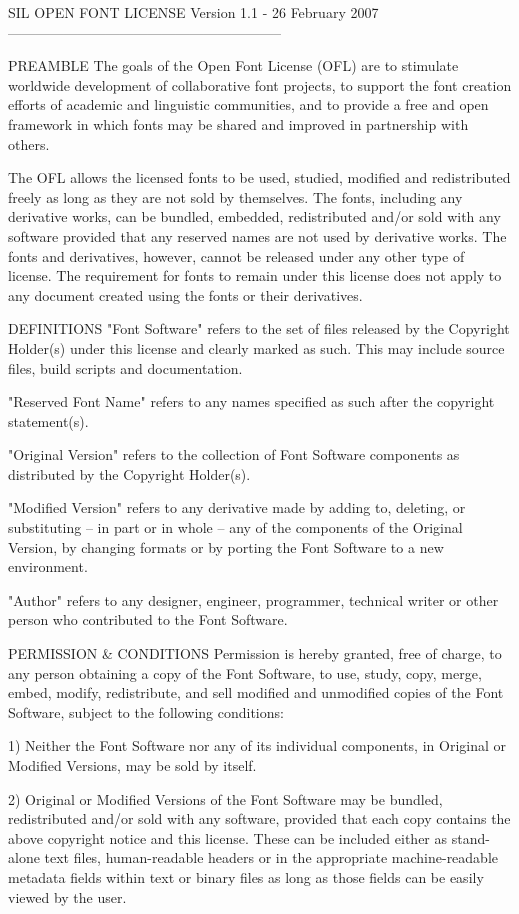 \begin{DoxyCode}
SIL OPEN FONT LICENSE Version 1.1 - 26 February 2007
-----------------------------------------------------------

PREAMBLE
The goals of the Open Font License (OFL) are to stimulate worldwide
development of collaborative font projects, to support the font creation
efforts of academic and linguistic communities, and to provide a free and
open framework in which fonts may be shared and improved in partnership
with others.

The OFL allows the licensed fonts to be used, studied, modified and
redistributed freely as long as they are not sold by themselves. The
fonts, including any derivative works, can be bundled, embedded,
redistributed and/or sold with any software provided that any reserved
names are not used by derivative works. The fonts and derivatives,
however, cannot be released under any other type of license. The
requirement for fonts to remain under this license does not apply
to any document created using the fonts or their derivatives.

DEFINITIONS
"Font Software" refers to the set of files released by the Copyright
Holder(s) under this license and clearly marked as such. This may
include source files, build scripts and documentation.

"Reserved Font Name" refers to any names specified as such after the
copyright statement(s).

"Original Version" refers to the collection of Font Software components as
distributed by the Copyright Holder(s).

"Modified Version" refers to any derivative made by adding to, deleting,
or substituting -- in part or in whole -- any of the components of the
Original Version, by changing formats or by porting the Font Software to a
new environment.

"Author" refers to any designer, engineer, programmer, technical
writer or other person who contributed to the Font Software.

PERMISSION & CONDITIONS
Permission is hereby granted, free of charge, to any person obtaining
a copy of the Font Software, to use, study, copy, merge, embed, modify,
redistribute, and sell modified and unmodified copies of the Font
Software, subject to the following conditions:

1) Neither the Font Software nor any of its individual components,
in Original or Modified Versions, may be sold by itself.

2) Original or Modified Versions of the Font Software may be bundled,
redistributed and/or sold with any software, provided that each copy
contains the above copyright notice and this license. These can be
included either as stand-alone text files, human-readable headers or
in the appropriate machine-readable metadata fields within text or
binary files as long as those fields can be easily viewed by the user.


\end{DoxyCode}

